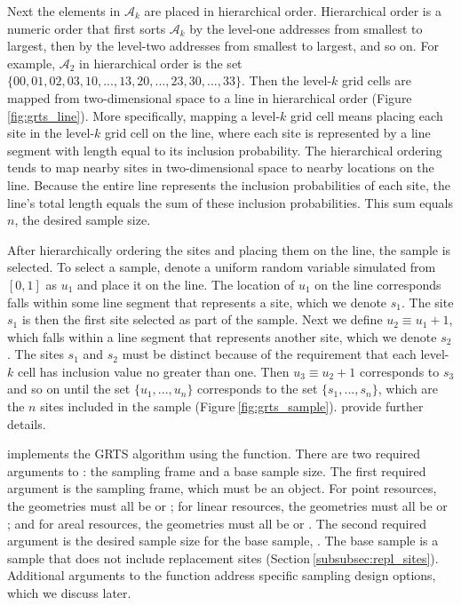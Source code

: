 \documentclass[
  shortnames]{jss}
\begin{document}
Next the elements in \(\mathcal{A}_k\) are placed in hierarchical order.
Hierarchical order is a numeric order that first sorts \(\mathcal{A}_k\)
by the level-one addresses from smallest to largest, then by the
level-two addresses from smallest to largest, and so on. For example,
\(\mathcal{A}_2\) in hierarchical order is the set
\(\{00, 01, 02, 03, 10, ..., 13, 20, ..., 23, 30, ..., 33\}\). Then the
level-\(k\) grid cells are mapped from two-dimensional space to a line
in hierarchical order (Figure\(~\)\ref{fig:grts_line}). More
specifically, mapping a level-\(k\) grid cell means placing each site in
the level-\(k\) grid cell on the line, where each site is represented by
a line segment with length equal to its inclusion probability. The
hierarchical ordering tends to map nearby sites in two-dimensional space
to nearby locations on the line. Because the entire line represents the
inclusion probabilities of each site, the line's total length equals the
sum of these inclusion probabilities. This sum equals \(n\), the desired
sample size.

After hierarchically ordering the sites and placing them on the line,
the sample is selected. To select a sample, \citet{stevens2004grts}
denote a uniform random variable simulated from \([0, 1]\) as \(u_1\)
and place it on the line. The location of \(u_1\) on the line
corresponds falls within some line segment that represents a site, which
we denote \(s_1\). The site \(s_1\) is then the first site selected as
part of the sample. Next we define \(u_2 \equiv u_1 + 1\), which falls
within a line segment that represents another site, which we denote
\(s_2\). The sites \(s_1\) and \(s_2\) must be distinct because of the
requirement that each level-\(k\) cell has inclusion value no greater
than one. Then \(u_3 \equiv u_2 + 1\) corresponds to \(s_3\) and so on
until the set \(\{u_1, ..., u_n\}\) corresponds to the set
\(\{s_1, ..., s_n\}\), which are the \(n\) sites included in the sample
(Figure\(~\)\ref{fig:grts_sample}). \citet{stevens2004grts} provide
further details.

 implements the GRTS algorithm using the 
function. There are two required arguments to : the
sampling frame and a base sample size. The first required argument is
the sampling frame, which must be an  object. For point
resources, the  geometries must all be  or
; for linear resources, the  geometries must
all be  or ; and for areal
resources, the  geometries must all be  or
. The second required argument is the desired sample
size for the base sample, . The base sample is a sample
that does not include replacement sites
(Section\(~\)\ref{subsubsec:repl_sites}). Additional arguments to the
 function address specific sampling design options, which
we discuss later.
\end{document}
